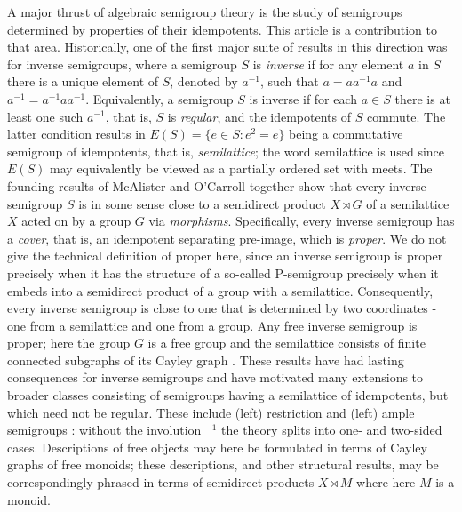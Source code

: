 \documentclass[12pt]{amsart}
\theoremstyle{definition}
\theoremstyle{definition}
\numberwithin{them}{section}
\numberwithin{equation}{section}
\begin{document}
 A major thrust of algebraic semigroup theory is the study of semigroups determined by properties of their idempotents. This article is a contribution to that area. Historically, one of  the first major suite of results in this direction was for inverse semigroups, where a semigroup $S$ is {\em inverse} if for any element $a$ in $S$ there is a unique element of $S$, denoted by $a^{-1}$, such that $a=aa^{-1}a$ and $a^{-1}=a^{-1}aa^{-1}$. Equivalently, a semigroup $S$ is inverse if for each $a\in S$ there is at least one such $a^{-1}$, that is, $S$ is {\em regular}, and the idempotents  of $S$ commute. The latter condition results in   $E(S)=\{ e\in S:e^2=e\}$ being a commutative semigroup of idempotents, that is, {\em semilattice}; the word semilattice is used since $E(S)$ may equivalently be viewed as a partially ordered set with meets.  The founding results of 
McAlister \cite{M1,M2} and O'Carroll \cite{O} together show that every inverse semigroup $S$ is in some sense close to a semidirect product $X\rtimes G$ of a semilattice $X$ acted on by a group $G$ via {\em morphisms}.
 Specifically, every inverse semigroup has a {\em cover}, that is,  an idempotent separating pre-image, which is {\em proper}. We do not give the technical definition of proper here, since an inverse semigroup is proper precisely when it has the structure of a so-called P-semigroup  precisely when it embeds into  a semidirect product of a group with a semilattice. Consequently,  every inverse semigroup is close to one that is  determined by two coordinates - one from a semilattice and one from a group.  Any free inverse semigroup is proper; here the group $G$ is a free group and the semilattice consists of finite connected subgraphs of its Cayley graph \cite{munn:72}.  These results have had lasting consequences for inverse semigroups and have motivated many extensions to  broader classes consisting of semigroups having a semilattice of idempotents, but which need not be regular. These include  (left) restriction and (left) ample semigroups \cite{F3, FGG, CG, kudryavtseva:2015, lawson:86}: without the involution $^{-1}$ the theory splits into one- and two-sided cases. Descriptions of free objects may here be formulated in terms of  Cayley graphs of free monoids; these descriptions, and other structural results, may be correspondingly phrased in terms of  semidirect products $X\rtimes M$ where here $M$ is a monoid.
\end{document}
